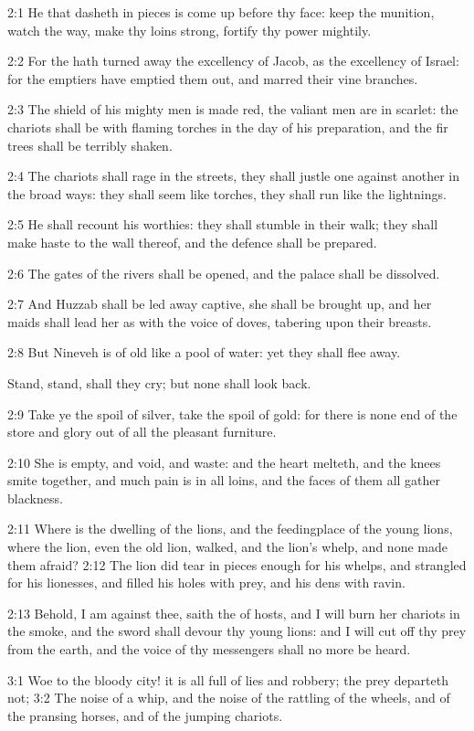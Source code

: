 2:1 He that dasheth in pieces is come up before thy face: keep the
munition, watch the way, make thy loins strong, fortify thy power
mightily.

2:2 For the \LORD hath turned away the excellency of Jacob, as the
excellency of Israel: for the emptiers have emptied them out, and
marred their vine branches.

2:3 The shield of his mighty men is made red, the valiant men are in
scarlet: the chariots shall be with flaming torches in the day of his
preparation, and the fir trees shall be terribly shaken.

2:4 The chariots shall rage in the streets, they shall justle one
against another in the broad ways: they shall seem like torches, they
shall run like the lightnings.

2:5 He shall recount his worthies: they shall stumble in their walk;
they shall make haste to the wall thereof, and the defence shall be
prepared.

2:6 The gates of the rivers shall be opened, and the palace shall be
dissolved.

2:7 And Huzzab shall be led away captive, she shall be brought up, and
her maids shall lead her as with the voice of doves, tabering upon
their breasts.

2:8 But Nineveh is of old like a pool of water: yet they shall flee
away.

Stand, stand, shall they cry; but none shall look back.

2:9 Take ye the spoil of silver, take the spoil of gold: for there is
none end of the store and glory out of all the pleasant furniture.

2:10 She is empty, and void, and waste: and the heart melteth, and the
knees smite together, and much pain is in all loins, and the faces of
them all gather blackness.

2:11 Where is the dwelling of the lions, and the feedingplace of the
young lions, where the lion, even the old lion, walked, and the lion's
whelp, and none made them afraid?  2:12 The lion did tear in pieces
enough for his whelps, and strangled for his lionesses, and filled his
holes with prey, and his dens with ravin.

2:13 Behold, I am against thee, saith the \LORD of hosts, and I will
burn her chariots in the smoke, and the sword shall devour thy young
lions: and I will cut off thy prey from the earth, and the voice of
thy messengers shall no more be heard.

3:1 Woe to the bloody city! it is all full of lies and robbery; the
prey departeth not; 3:2 The noise of a whip, and the noise of the
rattling of the wheels, and of the pransing horses, and of the jumping
chariots.

